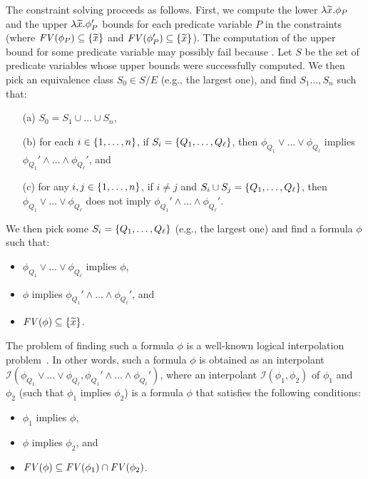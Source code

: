  The constraint 
solving proceeds as follows.  First, we compute the lower \(\lambda 
\widetilde{x}.\phi_P\) and the upper \(\lambda \widetilde{x}.\phi_P'\) bounds for 
each predicate variable \(P\) in the constraints (where \(\mathit{FV}({\phi_P}) 
\subseteq \{{\widetilde{x}}\}\) and \(\mathit{FV}({\phi_P'}) \subseteq \{{\widetilde{x}}\}\)). 
 The computation of the upper bound for some predicate variable may 
possibly fail because \todo{}.  Let \(S\) be the set of predicate 
variables whose upper bounds were successfully computed.  We then pick 
an equivalence class \(S_0 \in S / E\) (e.g., the largest one), and find 
\(S_1\dots,S_n\) such that:
\begin{itemize}
\item[(a)] \(S_0 = S_1 \cup \dots \cup S_n\),
\item[(b)] for each \(i \in \{{1,\dots,n}\}\), if \(S_i = 
\{{Q_1,\dots,Q_{\ell}}\}\), then \(\phi_{Q_1} \lor \dots \lor 
\phi_{Q_{\ell}}\) implies \(\phi_{Q_1}' \land \dots \land 
\phi_{Q_{\ell}}'\), and
\item[(c)] for any \(i,j \in \{{1,\dots,n}\}\), if \(i \neq j\) and 
\(S_i \cup S_j = \{{Q_1,\dots,Q_{\ell}}\}\), then \(\phi_{Q_1} \lor 
\dots \lor \phi_{Q_{\ell}}\) does not imply \(\phi_{Q_1}' \land \dots 
\land \phi_{Q_{\ell}}'\).
\end{itemize}
We then pick some \(S_i = \{{Q_1,\dots,Q_{\ell}}\}\) (e.g., the largest 
one) and find a formula \(\phi\) such that:
\begin{itemize}
\item \(\phi_{Q_1} \lor \dots \lor \phi_{Q_{\ell}}\) implies \(\phi\),
\item \(\phi\) implies \(\phi_{Q_1}' \land \dots \land \phi_{Q_{\ell}}'\), and
\item \(\mathit{FV}({\phi}) \subseteq \{{\widetilde{x}}\}\).
\end{itemize}
The problem of finding such a formula \(\phi\) is a well-known logical 
interpolation problem~\cite{}.  In other words, such a formula \(\phi\) 
is obtained as an interpolant \(\mathcal{I}(\phi_{Q_1} \lor \dots \lor 
\phi_{Q_{\ell}},\phi_{Q_1}' \land \dots \land \phi_{Q_{\ell}}')\), where 
an interpolant \(\mathcal{I}(\phi_1,\phi_2)\) of \(\phi_1\) and 
\(\phi_2\) (such that \(\phi_1\) implies \(\phi_2\)) is a formula 
\(\phi\) that satisfies the following conditions:
\begin{itemize}
\item \(\phi_1\) implies \(\phi\),
\item \(\phi\) implies \(\phi_2\), and
\item \(\mathit{FV}({\phi}) \subseteq \mathit{FV}({\phi_1}) \cap \mathit{FV}({\phi_2})\).
\end{itemize}
